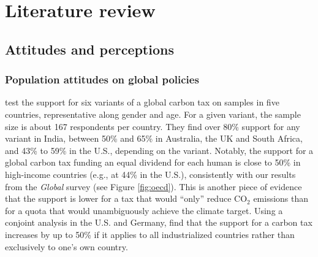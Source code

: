\clearpage
\section{Literature review}\label{sec:literature}

\subsection{Attitudes and perceptions}\label{subsec:literature_attitudes}

\subsubsection{Population attitudes on global policies}\label{subsubsec:literature_attitudes_policies}
\citet{carattini_how_2019} test the support for six variants of a global carbon tax on samples in five countries, representative along gender and age. For a given variant, the sample size is about 167 respondents per country. They find over 80\% support for any variant in India, between 50\% and 65\% in Australia, the UK and South Africa, and 43\% to 59\% in the U.S., depending on the variant. Notably, the support for a global carbon tax funding an equal dividend for each human is close to 50\% in high-income countries (e.g., at 44\% in the U.S.), consistently with our results from the \textit{Global} survey (see Figure \ref{fig:oecd}). This is another piece of evidence that the support is lower for a tax that would ``only'' reduce CO$_\text{2}$ emissions than for a quota that would unambiguously achieve the climate target. %
Using a conjoint analysis in the U.S. and Germany, \citet{beiser-mcgrath_could_2019} find that the support for a carbon tax increases by up to 50\% %
if it applies to all industrialized countries rather than exclusively to one's own country. %

